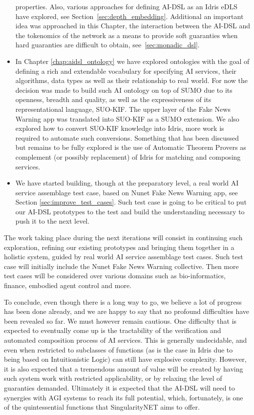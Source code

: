\documentclass[]{report}
\begin{document}
\begin{itemize}
  properties.  Also, various approaches for defining AI-DSL as an
  Idris eDLS have explored, see Section~\ref{sec:depth_embedding}.
  Additional an important idea was approached in this Chapter, the
  interaction between the AI-DSL and the tokenomics of the network as
  a means to provide soft guaranties when hard guaranties are
  difficult to obtain, see~\ref{sec:monadic_dsl}.
\item In Chapter \ref{chap:aidsl_ontology} we have explored ontologies
  with the goal of defining a rich and extendable vocabulary for
  specifying AI services, their algorithms, data types as well as
  their relationship to real world.  For now the decision was made to
  build such AI ontology on top of SUMO due to its openness, breadth
  and quality, as well as the expressiveness of its representational
  language, SUO-KIF.  The upper layer of the Fake News Warning app was
  translated into SUO-KIF as a SUMO extension.  We also explored how
  to convert SUO-KIF knowledge into Idris, more work is required to
  automate such conversions.  Something that has been discussed but
  remains to be fully explored is the use of Automatic Theorem Provers
  as complement (or possibly replacement) of Idris for matching and
  composing services.
\item We have started building, though at the preparatory level, a
  real world AI service assemblage test case, based on Nunet Fake News
  Warning app, see Section \ref{sec:improve_test_cases}.  Such test
  case is going to be critical to put our AI-DSL prototypes to the
  test and build the understanding necessary to push it to the next
  level.
\end{itemize}
The work taking place during the next iterations will consist in
continuing such exploration, refining our existing prototypes and
bringing them together in a holistic system, guided by real world AI
service assemblage test cases.  Such test case will initially include
the Nunet Fake News Warning collective.  Then more test cases will be
considered over various domains such as bio-informatics, finance,
embodied agent control and more.

To conclude, even though there is a long way to go, we believe a lot
of progress has been done already, and we are happy to say that no
profound difficulties have been revealed so far.  We must however
remain cautious.  One difficulty that is expected to eventually come
up is the tractability of the verification and automated composition
process of AI services.  This is generally undecidable, and even when
restricted to subclasses of functions (as is the case in Idris due to
being based on Intuitionistic Logic) can still have explosive
complexity.  However, it is also expected that a tremendous amount of
value will be created by having such system work with restricted
applicability, or by relaxing the level of guaranties demanded.
Ultimately it is expected that the AI-DSL will need to synergies with
AGI systems to reach its full potential, which, fortunately, is one of
the quintessential functions that SingularityNET aims to offer.
\end{document}
